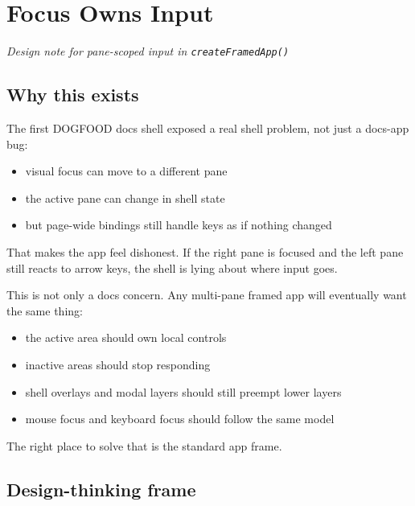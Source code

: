 \chapter{Focus Owns Input}\label{record-044}

\smallskip

\emph{Design note for pane-scoped input in \texttt{c\allowbreak{}r\allowbreak{}e\allowbreak{}a\allowbreak{}t\allowbreak{}e\allowbreak{}F\allowbreak{}r\allowbreak{}a\allowbreak{}m\allowbreak{}e\allowbreak{}d\allowbreak{}A\allowbreak{}p\allowbreak{}p\allowbreak{}(\allowbreak{})}}

\section{Why this exists}\label{record-044-why-this-exists}

The first DOGFOOD docs shell exposed a real shell problem, not just a docs-app bug:

\begin{itemize}
\tightlist
\item
  visual focus can move to a different pane
\item
  the active pane can change in shell state
\item
  but page-wide bindings still handle keys as if nothing changed
\end{itemize}

That makes the app feel dishonest. If the right pane is focused and the left pane still reacts to arrow keys, the shell is lying about where input goes.

This is not only a docs concern. Any multi-pane framed app will eventually want the same thing:

\begin{itemize}
\tightlist
\item
  the active area should own local controls
\item
  inactive areas should stop responding
\item
  shell overlays and modal layers should still preempt lower layers
\item
  mouse focus and keyboard focus should follow the same model
\end{itemize}

The right place to solve that is the standard app frame.

\section{Design-thinking frame}\label{record-044-design-thinking-frame}

